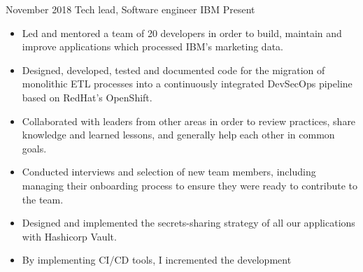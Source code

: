 %
%
%


\begin{experiences}
    \experience
        {November 2018}
        {Tech lead, Software engineer}
        {IBM}
        {Present}
        {
            \begin{itemize}
                \item Led and mentored a team of 20 developers in order to build, maintain and improve
                    applications which processed IBM's marketing data.
                \item Designed, developed, tested and documented code for the 
                    migration of monolithic ETL processes into a continuously 
                    integrated DevSecOps pipeline based on RedHat's OpenShift.
                \item Collaborated with leaders from other areas in order to review practices,
                    share knowledge and learned lessons, and generally help each other in common goals.
                \item Conducted interviews and selection of new team members, including managing their
                    onboarding process to ensure they were ready to contribute to the team.
                \item Designed and implemented the secrets-sharing strategy of
                    all our applications with Hashicorp Vault.
                \item By implementing CI/CD tools, I incremented the development 

\end{itemize}}
\end{experiences}
